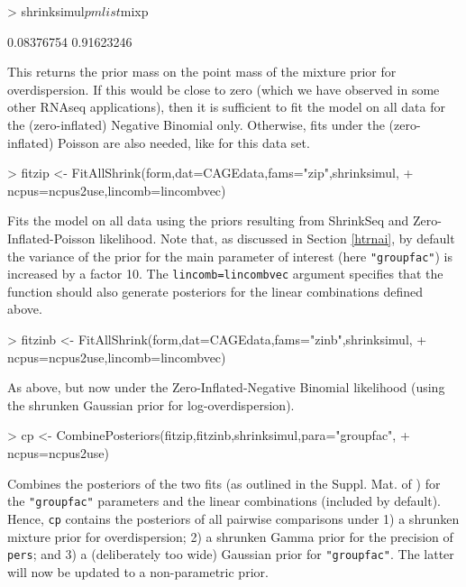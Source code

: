 \documentclass[11pt]{article}
\begin{document}
\begin{Schunk}
\begin{Sinput}
> shrinksimul$pmlist$mixp
\end{Sinput}
\begin{Soutput}
[1] 0.08376754 0.91623246
\end{Soutput}
\end{Schunk}
This returns the prior mass on the point mass of the mixture prior for overdispersion. If this would be close
to zero (which we have observed in some other RNAseq applications), then it is sufficient to fit the model on all data
for the (zero-inflated) Negative Binomial only. Otherwise, fits under the (zero-inflated) Poisson are also needed, like for this data set.


\begin{Schunk}
\begin{Sinput}
> fitzip <- FitAllShrink(form,dat=CAGEdata,fams="zip",shrinksimul,
+ ncpus=ncpus2use,lincomb=lincombvec)
\end{Sinput}
\end{Schunk}
Fits the model on all data using the priors resulting from ShrinkSeq and Zero-Inflated-Poisson likelihood. Note that, as discussed in Section
\ref{htrnai}, by default the variance of the prior for the main parameter of interest (here {\tt "groupfac"}) is increased by a factor 10.
The {\tt lincomb=lincombvec} argument specifies that the function should also generate posteriors for the linear combinations defined above.

\begin{Schunk}
\begin{Sinput}
> fitzinb <- FitAllShrink(form,dat=CAGEdata,fams="zinb",shrinksimul,
+ ncpus=ncpus2use,lincomb=lincombvec)
\end{Sinput}
\end{Schunk}
As above, but now under the Zero-Inflated-Negative Binomial likelihood (using the shrunken Gaussian prior for log-overdispersion).


\begin{Schunk}
\begin{Sinput}
> cp <- CombinePosteriors(fitzip,fitzinb,shrinksimul,para="groupfac",
+ ncpus=ncpus2use)
\end{Sinput}
\end{Schunk}
Combines the posteriors of the two fits (as outlined in the Suppl. Mat. of \cite[]{WielShrinkSeq}) for the {\tt "groupfac"} parameters and
the linear combinations  (included by default). Hence, {\tt cp} contains the posteriors of all pairwise comparisons under 1) a shrunken mixture prior
for overdispersion; 2) a shrunken Gamma prior for the precision of {\tt pers}; and 3) a (deliberately too wide) Gaussian prior
for {\tt "groupfac"}. The latter will now be updated to a non-parametric prior.
\end{document}
